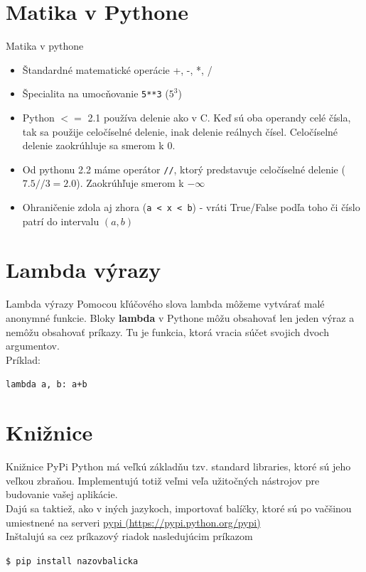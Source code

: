 \documentclass[12pt]{beamer}
\begin{document}
\section{Matika v Pythone}
\begin{frame}{Matika v pythone}
    \begin{itemize}
        \item<1>Štandardné matematické operácie +, -, *, /
        \item<2>Špecialita na umocňovanie \texttt{5**3} ($5^{3}$)
        \item<3> Python $<=$ 2.1 používa delenie ako v C. Keď sú oba operandy celé čísla,
                tak sa použije celočíselné delenie, inak delenie reálnych čísel.
            Celočíselné delenie zaokrúhluje sa smerom k 0.
        \item<4> Od pythonu 2.2 máme operátor \texttt{//},
                ktorý predstavuje celočíselné delenie ($7.5 // 3 = 2.0$).
                Zaokrúhľuje smerom k $-\infty$
        \item<5> Ohraničenie zdola aj zhora (\texttt{a < x < b}) - vráti True/False
            podľa toho či číslo patrí do intervalu $(a, b)$
    \end{itemize}
\end{frame}

\section{Lambda výrazy}
\begin{frame}{Lambda výrazy}
    Pomocou kľúčového slova lambda môžeme vytvárať malé anonymné funkcie.
    Bloky \textbf{lambda} v Pythone môžu obsahovať len jeden výraz a nemôžu obsahovať
    príkazy. Tu je funkcia, ktorá vracia súčet svojich dvoch argumentov.\\
    Príklad:
    \begin{center}
        \texttt{lambda a, b: a+b}
    \end{center}
\end{frame}

\section{Knižnice}
\begin{frame}{Knižnice PyPi}
    Python má veľkú základňu tzv. standard libraries, ktoré sú jeho veľkou
    zbraňou. Implementujú totiž veľmi veľa užitočných nástrojov pre budovanie
    vašej aplikácie.\\
    Dajú sa taktiež, ako v iných jazykoch, importovať balíčky, 
    ktoré sú po vačšinou umiestnené na serveri
    \href{https://pypi.python.org/pypi}{pypi (https://pypi.python.org/pypi)} \\
    Inštalujú sa cez príkazový riadok nasledujúcim príkazom \\
    \begin{center}
        \texttt{\$ pip install nazovbalicka}
    \end{center}
\end{frame}
\end{document}
